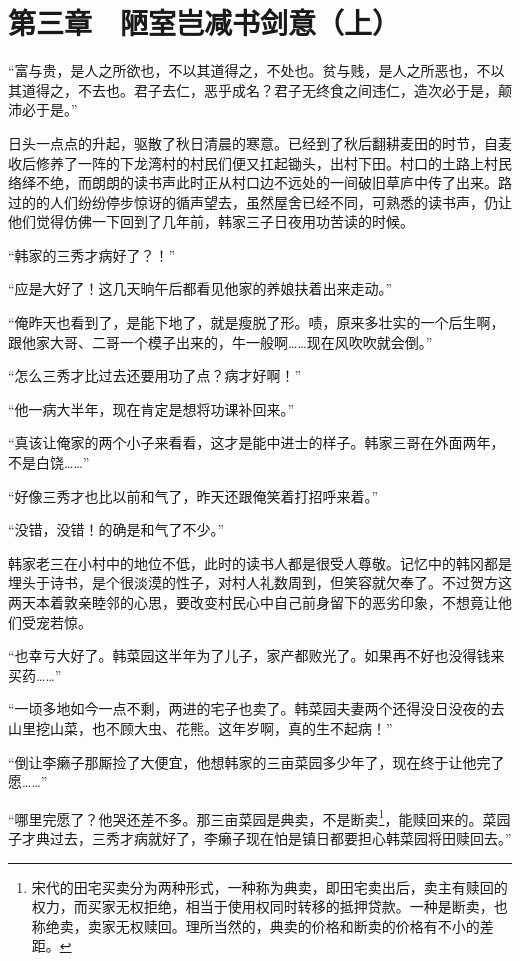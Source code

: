 \section{第三章　陋室岂减书剑意（上）}

“富与贵，是人之所欲也，不以其道得之，不处也。贫与贱，是人之所恶也，不以其道得之，不去也。君子去仁，恶乎成名？君子无终食之间违仁，造次必于是，颠沛必于是。”

日头一点点的升起，驱散了秋日清晨的寒意。已经到了秋后翻耕麦田的时节，自麦收后修养了一阵的下龙湾村的村民们便又扛起锄头，出村下田。村口的土路上村民络绎不绝，而朗朗的读书声此时正从村口边不远处的一间破旧草庐中传了出来。路过的的人们纷纷停步惊讶的循声望去，虽然屋舍已经不同，可熟悉的读书声，仍让他们觉得仿佛一下回到了几年前，韩家三子日夜用功苦读的时候。

“韩家的三秀才病好了？！”

“应是大好了！这几天晌午后都看见他家的养娘扶着出来走动。”

“俺昨天也看到了，是能下地了，就是瘦脱了形。啧，原来多壮实的一个后生啊，跟他家大哥、二哥一个模子出来的，牛一般啊……现在风吹吹就会倒。”

“怎么三秀才比过去还要用功了点？病才好啊！”

“他一病大半年，现在肯定是想将功课补回来。”

“真该让俺家的两个小子来看看，这才是能中进士的样子。韩家三哥在外面两年，不是白饶……”

“好像三秀才也比以前和气了，昨天还跟俺笑着打招呼来着。”

“没错，没错！的确是和气了不少。”

韩家老三在小村中的地位不低，此时的读书人都是很受人尊敬。记忆中的韩冈都是埋头于诗书，是个很淡漠的性子，对村人礼数周到，但笑容就欠奉了。不过贺方这两天本着敦亲睦邻的心思，要改变村民心中自己前身留下的恶劣印象，不想竟让他们受宠若惊。

“也幸亏大好了。韩菜园这半年为了儿子，家产都败光了。如果再不好也没得钱来买药……”

“一顷多地如今一点不剩，两进的宅子也卖了。韩菜园夫妻两个还得没日没夜的去山里挖山菜，也不顾大虫、花熊。这年岁啊，真的生不起病！”

“倒让李癞子那厮捡了大便宜，他想韩家的三亩菜园多少年了，现在终于让他完了愿……”

“哪里完愿了？他哭还差不多。那三亩菜园是典卖，不是断卖\footnote{宋代的田宅买卖分为两种形式，一种称为典卖，即田宅卖出后，卖主有赎回的权力，而买家无权拒绝，相当于使用权同时转移的抵押贷款。一种是断卖，也称绝卖，卖家无权赎回。理所当然的，典卖的价格和断卖的价格有不小的差距。}，能赎回来的。菜园子才典过去，三秀才病就好了，李癞子现在怕是镇日都要担心韩菜园将田赎回去。”

